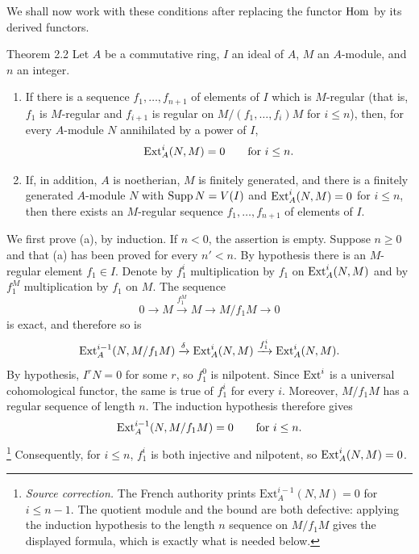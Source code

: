 We shall now work with these conditions after replacing the
functor $\operatorname{Hom}$ by its derived functors.

\begin{sgastatement}{Theorem 2.2}
Let $A$ be a commutative ring, $I$ an ideal of $A$, $M$ an $A$-module, and
$n$ an integer.
\begin{enumerate}[label=\textup{(\alph*)},leftmargin=2.5em]
\item If there is a sequence $f_1,\ldots,f_{n+1}$ of elements of $I$ which
is $M$-regular (that is, $f_1$ is $M$-regular and $f_{i+1}$ is regular on
$M/(f_1,\ldots,f_i)M$ for $i\le n$), then, for every $A$-module $N$
annihilated by a power of $I$,
\[
  \operatorname{Ext}_A^i(N,M)=0\qquad\text{for }i\le n.
\]
\item If, in addition, $A$ is noetherian, $M$ is finitely generated, and
there is a finitely generated $A$-module $N$ with $\operatorname{Supp} N=V(I)$ and
$\operatorname{Ext}_A^i(N,M)=0$ for $i\le n$, then there exists an $M$-regular
sequence $f_1,\ldots,f_{n+1}$ of elements of $I$.
\end{enumerate}
\end{sgastatement}

We first prove (a), by induction. If $n<0$, the assertion is empty. Suppose
$n\ge0$ and that (a) has been proved for every $n'<n$. By hypothesis there
is an $M$-regular element $f_1\in I$. Denote by $f_1^i$ multiplication by
$f_1$ on $\operatorname{Ext}_A^i(N,M)$ and by $f_1^M$ multiplication by $f_1$ on $M$.
The sequence
\begin{equation}\label{eq:III.2.1}
  0\longrightarrow M\xrightarrow{f_1^M}M\longrightarrow M/f_1M
  \longrightarrow0
\end{equation}
is exact, and therefore so is
\[
  \operatorname{Ext}_A^{i-1}(N,M/f_1M)\xrightarrow{\delta}\operatorname{Ext}_A^i(N,M)
  \xrightarrow{f_1^i}\operatorname{Ext}_A^i(N,M).
\]
By hypothesis, $I^rN=0$ for some $r$, so $f_1^0$ is nilpotent. Since
$\operatorname{Ext}^i$ is a universal cohomological functor, the same is true of
$f_1^i$ for every $i$. Moreover, $M/f_1M$ has a regular sequence of length
$n$. The induction hypothesis therefore gives
\[
  \operatorname{Ext}_A^{i-1}(N,M/f_1M)=0\qquad\text{for }i\le n.
\]
\footnote{\textit{Source correction.} The French authority prints
$\mathrm{Ext}_A^{i-1}(N,M)=0$ for $i\le n-1$. The quotient module and the
bound are both defective: applying the induction hypothesis to the length
$n$ sequence on $M/f_1M$ gives the displayed formula, which is exactly what
is needed below.}
Consequently, for $i\le n$, $f_1^i$ is both injective and nilpotent, so
$\operatorname{Ext}_A^i(N,M)=0$.

